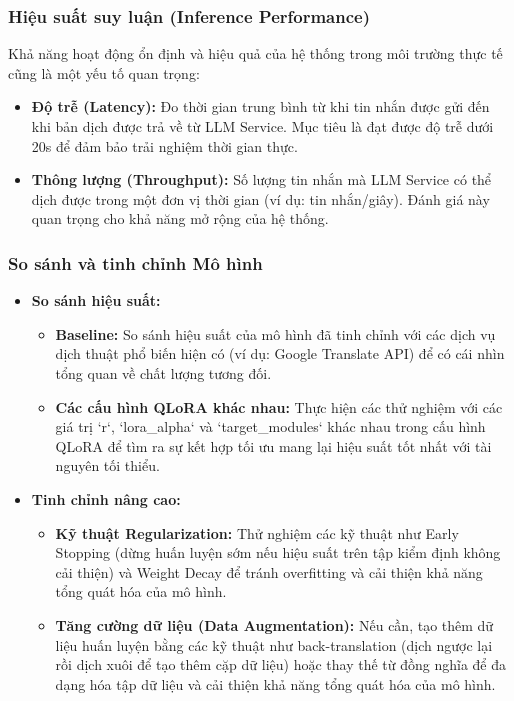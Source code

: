 \subsubsection{Hiệu suất suy luận (Inference Performance)}
Khả năng hoạt động ổn định và hiệu quả của hệ thống trong môi trường thực tế cũng là một yếu tố quan trọng:
\begin{itemize}
    \item \textbf{Độ trễ (Latency):} Đo thời gian trung bình từ khi tin nhắn được gửi đến khi bản dịch được trả về từ LLM Service. Mục tiêu là đạt được độ trễ dưới 20s để đảm bảo trải nghiệm thời gian thực.
    \item \textbf{Thông lượng (Throughput):} Số lượng tin nhắn mà LLM Service có thể dịch được trong một đơn vị thời gian (ví dụ: tin nhắn/giây). Đánh giá này quan trọng cho khả năng mở rộng của hệ thống.
\end{itemize}

\subsubsection{So sánh và tinh chỉnh Mô hình}
\begin{itemize}
    \item \textbf{So sánh hiệu suất:}
    \begin{itemize}
        \item \textbf{Baseline:} So sánh hiệu suất của mô hình đã tinh chỉnh với các dịch vụ dịch thuật phổ biến hiện có (ví dụ: Google Translate API) để có cái nhìn tổng quan về chất lượng tương đối.
        \item \textbf{Các cấu hình QLoRA khác nhau:} Thực hiện các thử nghiệm với các giá trị `r`, `lora\_alpha` và `target\_modules` khác nhau trong cấu hình QLoRA để tìm ra sự kết hợp tối ưu mang lại hiệu suất tốt nhất với tài nguyên tối thiểu.
    \end{itemize}
    \item \textbf{Tinh chỉnh nâng cao:}
    \begin{itemize}
        \item \textbf{Kỹ thuật Regularization:} Thử nghiệm các kỹ thuật như Early Stopping (dừng huấn luyện sớm nếu hiệu suất trên tập kiểm định không cải thiện) và Weight Decay để tránh overfitting và cải thiện khả năng tổng quát hóa của mô hình.
        \item \textbf{Tăng cường dữ liệu (Data Augmentation):} Nếu cần, tạo thêm dữ liệu huấn luyện bằng các kỹ thuật như back-translation (dịch ngược lại rồi dịch xuôi để tạo thêm cặp dữ liệu) hoặc thay thế từ đồng nghĩa để đa dạng hóa tập dữ liệu và cải thiện khả năng tổng quát hóa của mô hình.
    \end{itemize}
\end{itemize}
